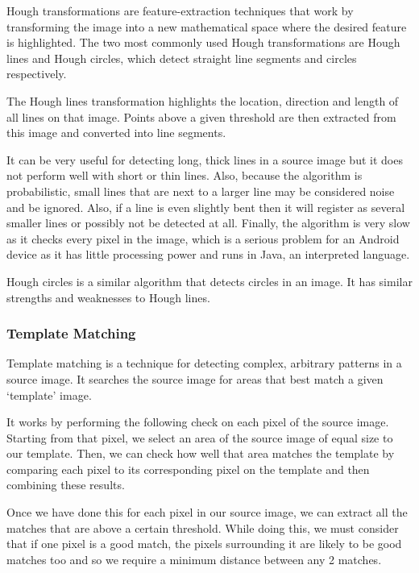 Hough transformations are feature-extraction techniques that work by transforming the image into a new mathematical space where the desired feature is highlighted. The two most commonly used Hough transformations are Hough lines and Hough circles, which detect straight line segments and circles respectively.

The Hough lines transformation highlights the location, direction and length of all lines on that image. Points above a given threshold are then extracted from this image and converted into line segments.

It can be very useful for detecting long, thick lines in a source image but it does not perform well with short or thin lines. Also, because the algorithm is probabilistic, small lines that are next to a larger line may be considered noise and be ignored. Also, if a line is even slightly bent then it will register as several smaller lines or possibly not be detected at all. Finally, the algorithm is very slow as it checks every pixel in the
image, which is a serious problem for an Android device as it has little processing power and runs in Java, an interpreted language.

Hough circles is a similar algorithm that detects circles in an image. It has similar strengths and weaknesses to Hough lines.

\subsubsection{Template Matching}

Template matching is a technique for detecting complex, arbitrary patterns in a source image. It searches the source image for areas that best match a given ‘template’ image.

It works by performing the following check on each pixel of the source image. Starting from that pixel, we select an area of the source image of equal size to our template. Then, we can check how well that area matches the template by comparing each pixel to its corresponding pixel on the template and then combining these results. 

Once we have done this for each pixel in our source image, we can extract all the matches that are above a certain threshold. While doing this, we must consider that if one pixel is a good match, the pixels surrounding it are likely to be good matches too and so we require a minimum distance between any 2 matches.
    
